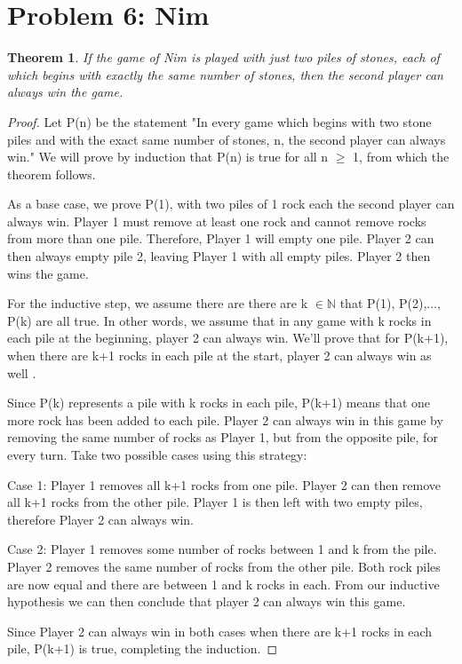 \documentclass[10pt,letter]{article}
\newtheorem*{thm}{Theorem}
\begin{document}
\section*{Problem 6: Nim}
\begin{thm}
If the game of Nim  is played with just two piles of stones, each of which begins with exactly the same number of stones, then the second player can always win the game. 
\end{thm}
\begin{proof}
Let P(n) be the statement "In every game which begins with two stone piles and with the exact same number of stones, n, the second player can always win." We will prove by induction that P(n) is true for all n $\geq$ 1, from which the theorem follows.

As a base case, we prove P(1), with two piles of 1 rock each the second player can always win. Player 1 must remove at least one rock and cannot remove rocks from more than one pile. Therefore, Player 1 will empty one pile. Player 2 can then always empty pile 2, leaving Player 1 with all empty piles. Player 2 then wins the game. 

For the inductive step, we assume there are there are k  $\in \mathbb{N}$ that P(1), P(2),..., P(k) are all true. In other words, we assume that in any game with k rocks in each pile at the beginning, player 2 can always win. We'll prove that for P(k+1), when there are k+1 rocks in each pile at the start, player 2 can always win as well . 

Since P(k) represents a pile with k rocks in each pile, P(k+1) means that one more rock has been added to each pile. Player 2 can always win in this game by removing the same number of rocks as Player 1, but from the opposite pile, for every turn. Take two possible cases using this strategy:

Case 1: Player 1 removes all k+1 rocks from one pile. Player 2 can then remove all k+1 rocks from the other pile. Player 1 is then left with two empty piles, therefore Player 2 can always win. 

Case 2: Player 1 removes some number of rocks between 1 and k from the pile. Player 2 removes the same number of rocks from the other pile. Both rock piles are now equal and there are between 1 and k rocks in each. 
From our inductive hypothesis we can then conclude that player 2 can always win this game. 

Since Player 2 can always win in both cases when there are k+1 rocks in each pile, P(k+1) is true, completing the induction. 
\end{proof}
\end{document}
